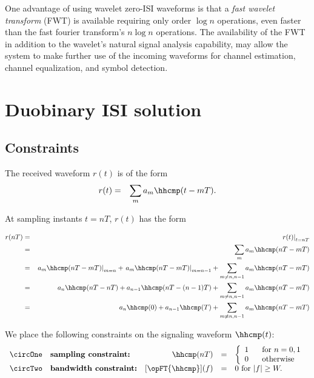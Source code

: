 One advantage of using wavelet zero-ISI waveforms is that a {\em fast wavelet transform}
(FWT) is available requiring only order $\log n$ operations,
even faster than the fast fourier transform's $n\log n$ operations.
The availability of the FWT in addition to the wavelet's natural
signal analysis capability, may allow the system to make further use of the
incoming waveforms for channel estimation, channel equalization, and
symbol detection.








\section{Duobinary ISI solution}
\label{sec:isi_duo}
\label{sec:duobinary}
\subsection{Constraints}
The received waveform $r(t)$ is of the form
\begin{eqnarray*}
   r(t) &=& \sum_m a_m \hhcmp(t-mT).
\end{eqnarray*}

At sampling instants $t=nT$, $r(t)$ has the form

\begin{eqnarray*}
   r(nT)
     &=& \left. r(t)                               \right|_{t=nT}
   \\&=& \sum_m a_m \hhcmp(nT-mT)
   \\&=& \left. a_m\hhcmp(nT-mT)\right|_{m=n}     +
         \left. a_m\hhcmp(nT-mT)\right|_{m=n-1}   +
         \sum_{m\ne n,n-1} a_m \hhcmp(nT-mT)
   \\&=& a_n\hhcmp(nT-nT) + a_{n-1}\hhcmp(nT-(n-1)T) + \sum_{m\ne n,n-1} a_m \hhcmp(nT-mT)
   \\&=& a_n\hhcmp(0) +
         a_{n-1}\hhcmp(T) +
         \sum_{m\ne n,n-1} a_m \hhcmp(nT-mT)
\end{eqnarray*}

We place the following constraints on the signaling waveform $\hhcmp(t)$:
\[
\begin{array}{llrcl}
   \circOne & \mbox{\bf sampling constraint:}
      & \hhcmp(nT) &=&
          \left\{\begin{array}{l@{\hspace{4ex}}l}
            1 &   \mbox{for } n=0,1 \\
            0 &   \mbox{otherwise}
          \end{array}\right.
\\
   \circTwo & \mbox{\bf bandwidth constraint:}
      & [\opFT{\hhcmp}](f) &=& 0 \mbox{ for } |f|\ge W.
\end{array}
\]

